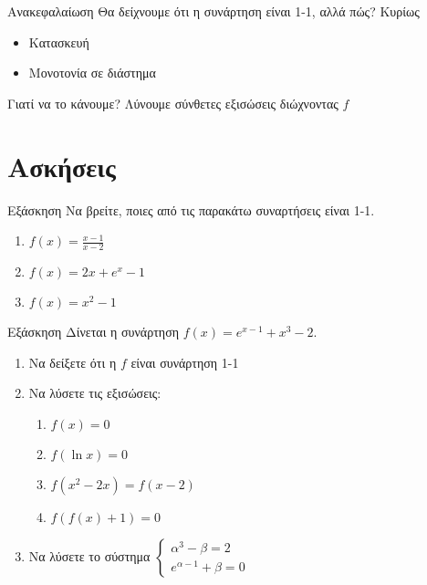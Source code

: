 \documentclass[greek]{beamer}
\begin{document}
\begin{frame}{Ανακεφαλαίωση}
  Θα δείχνουμε ότι η συνάρτηση είναι 1-1, αλλά πώς? \pause
  Κυρίως
  \begin{itemize}
    \item Κατασκευή \pause
    \item Μονοτονία σε διάστημα
  \end{itemize} \pause
  \begin{alertblock}{Γιατί να το κάνουμε?}
    Λύνουμε σύνθετες εξισώσεις διώχνοντας $f$
  \end{alertblock}
\end{frame}

\section{Ασκήσεις}
\begin{frame}{Εξάσκηση}
  Να βρείτε, ποιες από τις  παρακάτω συναρτήσεις είναι 1-1.
  \begin{enumerate}
    \item $f(x)=\frac{x-1}{x-2}$\pause
    \item $f(x)=2x+e^x-1$\pause
    \item $f(x)=x^2-1$
  \end{enumerate}
\end{frame}

\begin{frame}{Εξάσκηση}
  Δίνεται η συνάρτηση $f(x)=e^{x-1}+x^3-2$.
  \begin{enumerate}
    \item Να δείξετε ότι η $f$ είναι συνάρτηση 1-1 \pause
    \item Να λύσετε τις εξισώσεις:
          \begin{enumerate}
            \item $f(x)=0$ \pause
            \item $f(\ln x)=0$ \pause
            \item $f(x^2-2x)=f(x-2)$ \pause
            \item $f\left(f(x)+1\right)=0$ \pause
          \end{enumerate}
    \item Να λύσετε το σύστημα $\begin{cases}
              α^3-β=2 \\
              e^{α-1}+β=0
            \end{cases}$
  \end{enumerate}
\end{frame}
\end{document}
